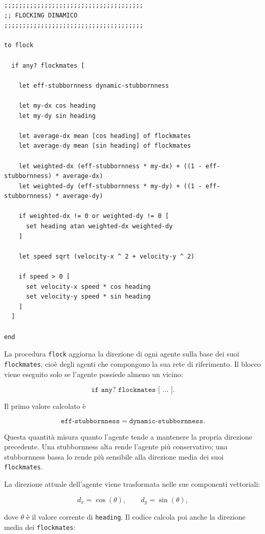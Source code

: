 \begin{lstlisting}[caption={Procedura di flocking dinamico degli agenti}]
;;;;;;;;;;;;;;;;;;;;;;;;;;;;;;;;;;;;;;
;; FLOCKING DINAMICO
;;;;;;;;;;;;;;;;;;;;;;;;;;;;;;;;;;;;;;

to flock

  if any? flockmates [

    let eff-stubbornness dynamic-stubbornness

    let my-dx cos heading
    let my-dy sin heading

    let average-dx mean [cos heading] of flockmates
    let average-dy mean [sin heading] of flockmates

    let weighted-dx (eff-stubbornness * my-dx) + ((1 - eff-stubbornness) * average-dx)
    let weighted-dy (eff-stubbornness * my-dy) + ((1 - eff-stubbornness) * average-dy)

    if weighted-dx != 0 or weighted-dy != 0 [
      set heading atan weighted-dx weighted-dy
    ]

    let speed sqrt (velocity-x ^ 2 + velocity-y ^ 2)

    if speed > 0 [
      set velocity-x speed * cos heading
      set velocity-y speed * sin heading
    ]
  ]

end
\end{lstlisting}

La procedura \texttt{flock} aggiorna la direzione di ogni agente sulla base dei
suoi \texttt{flockmates}, cioè degli agenti che compongono la sua rete di
riferimento. Il blocco viene eseguito solo se l'agente possiede almeno un vicino:

\[
\texttt{if any? flockmates [ ... ]}.
\]

Il primo valore calcolato è

\[
\texttt{eff-stubbornness} = \texttt{dynamic-stubbornness}.
\]

Questa quantità misura quanto l'agente tende a mantenere la propria direzione
precedente. Una stubbornness alta rende l'agente più conservativo; una
stubbornness bassa lo rende più sensibile alla direzione media dei suoi
\texttt{flockmates}.

La direzione attuale dell'agente viene trasformata nelle sue componenti
vettoriali:

\[
d_x = \cos(\theta),
\qquad
d_y = \sin(\theta),
\]

dove \(\theta\) è il valore corrente di \texttt{heading}. Il codice calcola poi
anche la direzione media dei \texttt{flockmates}:

